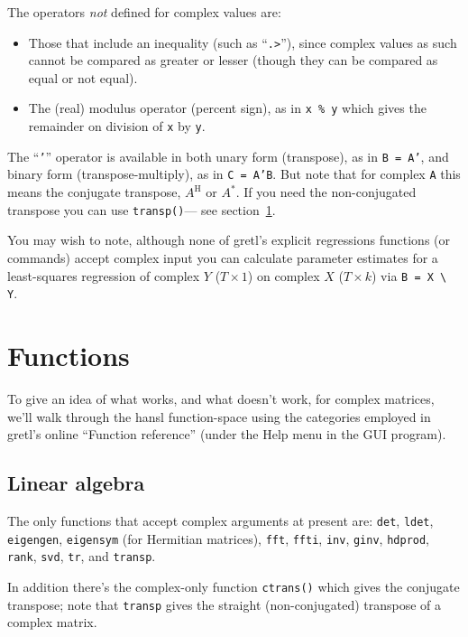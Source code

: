 \documentclass{article}
\begin{document}
The operators \textit{not} defined for complex values are:
\begin{itemize}
\item Those that include an inequality (such as ``\verb+.>+''), since
  complex values as such cannot be compared as greater or lesser
  (though they can be compared as equal or not equal).
\item The (real) modulus operator (percent sign), as in \texttt{x \%
    y} which gives the remainder on division of \texttt{x} by
  \texttt{y}.
\end{itemize}

The ``\texttt{'}'' operator is available in both unary form
(transpose), as in \texttt{B = A'}, and binary form
(transpose-multiply), as in \texttt{C = A'B}. But note that for
complex \texttt{A} this means the conjugate transpose, $A^\mathrm{H}$ or
$A^*$. If you need the non-conjugated transpose you can use
\texttt{transp()}--- see section~\ref{sec:funcs}.

You may wish to note, although none of gretl's explicit regressions
functions (or commands) accept complex input you can calculate
parameter estimates for a least-squares regression of complex $Y$
($T \times 1$) on complex $X$ ($T \times k$) via \verb|B = X \ Y|.

\section{Functions}
\label{sec:funcs}

To give an idea of what works, and what doesn't work, for complex
matrices, we'll walk through the hansl function-space using the
categories employed in gretl's online ``Function reference'' (under the
\textsf{Help} menu in the GUI program).

\subsection{Linear algebra}

The only functions that accept complex arguments at present are:
\texttt{det}, \texttt{ldet}, \texttt{eigengen}, \texttt{eigensym} (for
Hermitian matrices), \texttt{fft}, \texttt{ffti}, \texttt{inv},
\texttt{ginv}, \texttt{hdprod}, \texttt{rank}, \texttt{svd},
\texttt{tr}, and \texttt{transp}.

In addition there's the complex-only function \texttt{ctrans()} which
gives the conjugate transpose; note that \texttt{transp} gives the
straight (non-conjugated) transpose of a complex matrix.
\end{document}
